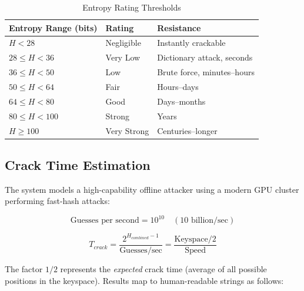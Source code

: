 \documentclass[12pt,a4paper]{article}
\begin{document}
\begin{table}[H]
\centering
\begin{tabular}{lll}
\toprule
\textbf{Entropy Range (bits)} & \textbf{Rating} & \textbf{Resistance} \\
\midrule
$H < 28$  & Negligible  & Instantly crackable \\
$28 \leq H < 36$ & Very Low & Dictionary attack, seconds \\
$36 \leq H < 50$ & Low      & Brute force, minutes--hours \\
$50 \leq H < 64$ & Fair     & Hours--days \\
$64 \leq H < 80$ & Good     & Days--months \\
$80 \leq H < 100$ & Strong  & Years \\
$H \geq 100$ & Very Strong  & Centuries--longer \\
\bottomrule
\end{tabular}
\caption{Entropy Rating Thresholds}
\end{table}

\subsection{Crack Time Estimation}

The system models a high-capability offline attacker using a modern GPU
cluster performing fast-hash attacks:

\begin{equation}
\text{Guesses per second} = 10^{10} \quad (10\text{ billion/sec})
\label{eq:speed}
\end{equation}

\begin{equation}
T_{crack} = \frac{2^{H_{combined} - 1}}{\text{Guesses/sec}}
          = \frac{\text{Keyspace} / 2}{\text{Speed}}
\label{eq:crack}
\end{equation}

The factor $1/2$ represents the \textit{expected} crack time (average of
all possible positions in the keyspace). Results map to human-readable
strings as follows:
\end{document}
